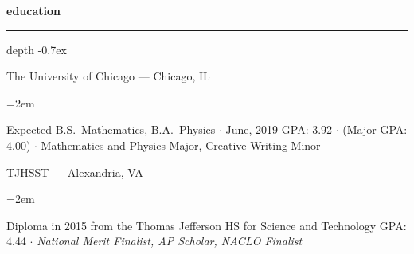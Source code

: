 \documentclass[12pt]{scrartcl}
\newcommand{\Description}[1]{\hangindent=2em\hangafter=0\noindent\raggedright\footnotesize{#1}\par\normalsize\vspace{0.5em}} %
\def\vhrulefill{\leavevmode\leaders\hrule height 0.7ex depth \dimexpr0.4pt-0.7ex\hfill\kern0pt}
\begin{document}
\date{}

\thispagestyle{empty} %



\begin{cv}{}\vspace{1.5em} %


\noindent
\begin{minipage}[t]{.6\textwidth}

\noindent\textbf{education} \hspace{1ex} \vhrulefill \vspace{0.5em} 

{\footnotesize\noindent
The University of Chicago --- Chicago, IL}

\Description{Expected B.S.\ Mathematics, B.A.\ Physics $\cdotp$ June, 2019\newline
GPA: 3.92 $\cdotp$ (Major GPA: 4.00) $\cdotp$ Mathematics and Physics Major, Creative Writing Minor
}

{\footnotesize\noindent
TJHSST --- Alexandria, VA}

\Description{Diploma in 2015 from the Thomas Jefferson HS for Science and Technology\newline
GPA: 4.44 $\cdotp$ \textit{National Merit Finalist, AP Scholar, NACLO Finalist}
}

\end{minipage}\hspace{1em}%
\begin{minipage}[t]{.35\textwidth}



\end{minipage}
\end{cv}
\end{document}

